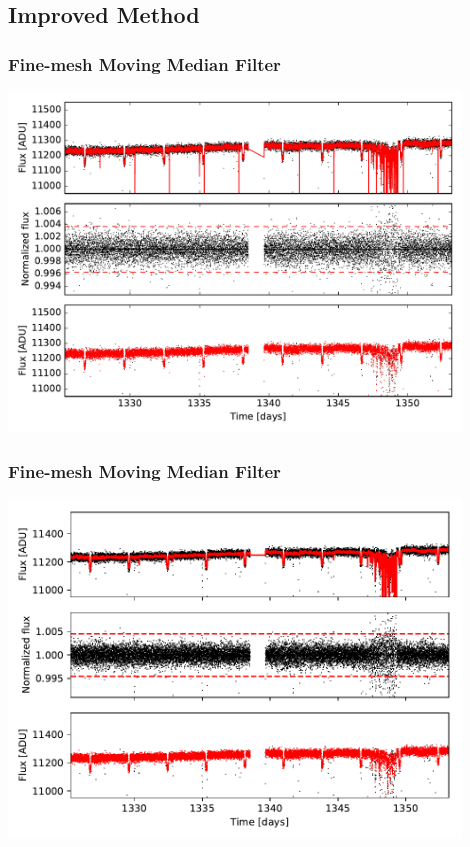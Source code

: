 \documentclass[notes]{beamer}
\begin{document}
\subsection{Improved Method}

\begin{frame}
\frametitle{Fine-mesh Moving Median Filter}
\centering
\includegraphics[width=0.9\textwidth]{../figures/2018-11-27_14:45:48_fine_mesh0.pdf}
\end{frame}

\begin{frame}
\frametitle{Fine-mesh Moving Median Filter}
\centering
\includegraphics[width=0.9\textwidth]{../figures/2019-1-15_11:5:15_finemesh_TIC38846515.pdf}
\end{frame}
\end{document}
